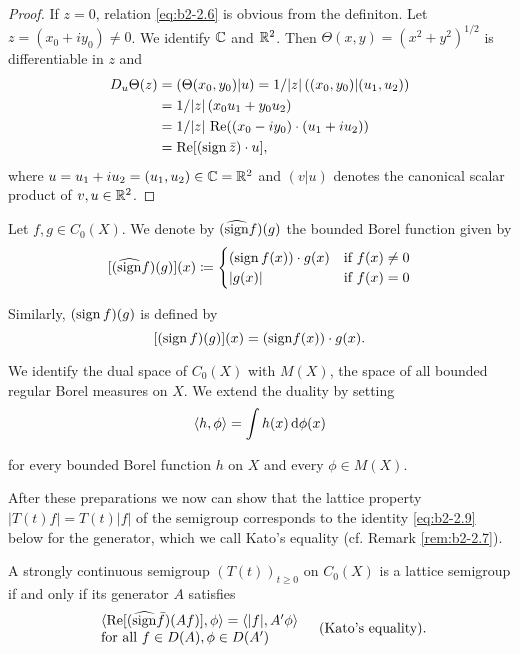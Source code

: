 \begin{proof}
If $z = 0$, relation \eqref{eq:b2-2.6} is obvious from the definiton.
Let $z = (x_{0} + iy_{0}) \neq 0$.
We identify $\mathbb{C}$ and $\mathbb{R}^2$.
Then $\Theta(x,y) = (x^2 + y^2)^{1/2}$ is differentiable in $z$ and
\begin{align*}
D_{u}\Theta(z) &= (\Theta(x_{0},y_{0})|u) = 1/|z|\, ((x_{0},y_{0})|(u_{1},u_{2}))  \\
               &= 1/|z|\, (x_{0}u_{1} + y_{0}u_{2}) \\
               &= 1/|z|\, \mathop{}\!\mathrm{Re}((x_{0}-iy_{0})\cdot(u_{1}+iu_{2})) \\
               &= \mathop{}\!\mathrm{Re}[(\operatorname{sign} \bar{z})\cdot u],
\end{align*}
where $u = u_{1} + iu_{2} = (u_{1},u_{2}) \in \mathbb{C} = \mathbb{R}^2$ and $(v|u)$ denotes the canonical scalar product of $v,u \in \mathbb{R}^2$.
\end{proof}

Let $f, g \in C_{0}(X)$.
We denote by $(\widehat{\operatorname{sign}} f)(g)$ the bounded Borel function given by
\begin{equation}\label{eq:b2-2.7}
[(\widehat{\operatorname{sign}} f)(g)](x) \coloneqq \begin{cases}
    (\operatorname{sign} f(x))\cdot g(x) & \text{if } f(x) \neq 0 \\
    |g(x)| & \text{if } f(x) = 0
\end{cases}
\end{equation}

Similarly, $(\operatorname{sign} f)(g)$ is defined by
\begin{equation}\label{eq:b2-2.8}
[(\operatorname{sign} f)(g)](x) = ({\operatorname{sign}} f(x))\cdot g(x).
\end{equation}

We identify the dual space of $C_{0}(X)$ with $M(X)$, the space of all bounded regular Borel measures on $X$.
We extend the duality by setting
\begin{equation*}
\langle h,\phi \rangle = \int h(x)   \mathop{}\!\mathrm{d}{\phi}(x)
\end{equation*}

for every bounded Borel function $h$ on $X$ and every $\phi \in M(X)$.

After these preparations we now can show that the lattice property $|T(t)f| = T(t)|f|$ of the semigroup corresponds to the identity \eqref{eq:b2-2.9} below for the generator, which we call Kato's equality (cf. Remark \ref{rem:b2-2.7}).

\begin{theorem}\label{thm:b2-2.5}
A strongly continuous semigroup $(T(t))_{t \geq 0}$ on $C_{0}(X)$ is a lattice semigroup if and only if its generator $A$ satisfies
\begin{equation}\label{eq:b2-2.9}
\begin{array}{l}
\langle \mathop{}\!\mathrm{Re}[(\widehat{\operatorname{sign}} \bar{f})(Af)],\phi \rangle = \langle |f|,A'\phi \rangle \\
\text{for all } f \in D(A), \phi \in D(A') 
\end{array} \quad \text{(Kato's equality)}.
\end{equation}
\end{theorem}

